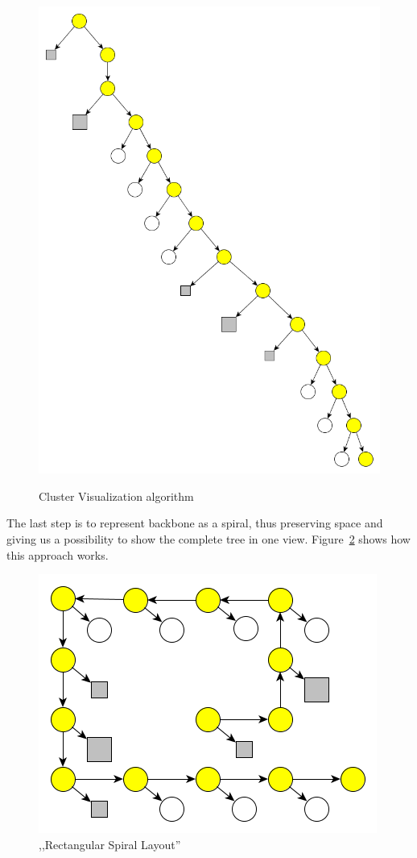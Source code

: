 \begin{figure}[h!]
{    \includegraphics[scale=0.15]{pictures/cluster_visualisation_algorithm_3.png}
    \label{fig:cluster_visualisation_algorithm_3}
}
\caption{Cluster Visualization algorithm}
\label{fig:cluster_visualisation_algorithm}
\end{figure}

The last step is to represent backbone as a spiral, thus preserving space and giving us a possibility to show the complete tree in one view. Figure~\ref{fig:cluster_visualisation_algorithm_4} shows how this approach works.

\begin{figure}[h!]
\centering
\includegraphics[scale=0.5]{pictures/cluster_visualisation_algorithm_4.png}
\caption{,,Rectangular Spiral Layout''}
\label{fig:cluster_visualisation_algorithm_4}
\end{figure}

